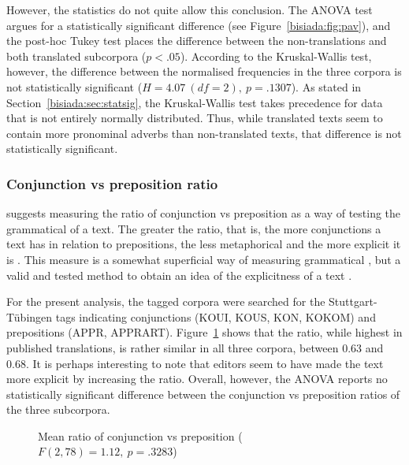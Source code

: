 \documentclass[output=paper]{LSP/langsci}
\begin{document}
\noindent However, the statistics do not quite allow this conclusion. The ANOVA test argues for a statistically significant difference (see Figure~\ref{bisiada:fig:pav}), and the post-hoc Tukey test places the difference between the non-translations and both translated subcorpora ($p<.05$). According to the Kruskal-Wallis test, however, the difference between the normalised frequencies in the three corpora is not statistically significant ($H=4.07~(df=2),~p=.1307$). As stated in Section~\ref{bisiada:sec:statsig}, the Kruskal-Wallis test takes precedence for data that is not entirely normally distributed. Thus, while translated texts seem to contain more pronominal adverbs than non-translated texts, that difference is not statistically significant.

\subsubsection{Conjunction vs preposition ratio}
\largerpage
\textcite[26]{steiner01} suggests measuring the ratio of conjunction vs preposition as a way of testing the grammatical  of a text. The greater the ratio, that is, the more conjunctions a text has in relation to prepositions, the less metaphorical and the more explicit it is \parencite[26]{steiner01}. This measure is a somewhat superficial way of measuring grammatical , but a valid and tested method to obtain an idea of the explicitness of a text \parencite[252]{steiner08}.

For the present analysis, the tagged corpora were searched for the Stuttgart-Tübingen tags indicating conjunctions (KOUI, KOUS, KON, KOKOM) and prepositions (APPR, APPRART). Figure~\ref{bisiada:fig:conpre} shows that the ratio, while highest in published translations, is rather similar in all three corpora, between 0.63 and 0.68. It is perhaps interesting to note that editors seem to have made the text more explicit by increasing the ratio. Overall, however, the ANOVA reports no statistically significant difference between the conjunction vs preposition ratios of the three subcorpora.

\begin{figure}
  \caption{Mean ratio of conjunction vs preposition ($F(2,78)=1.12,~p=.3283$)}\label{bisiada:fig:conpre}
\end{figure}
\end{document}
